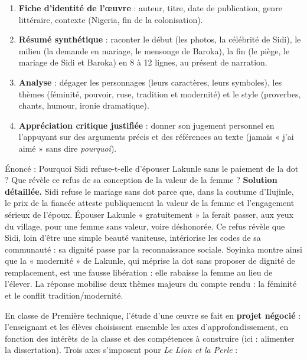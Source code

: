 \documentclass[11pt]{article}
\newcounter{popsec}
\newcounter{popsub}
\newcommand{\courssub}[1]{%
  \stepcounter{popsub}%
  \par\vspace{9pt}\noindent{\popxbold\fontsize{11.5}{13}\selectfont\color{popink}{\color{poporange}\thepopsec.\thepopsub}\hspace{6pt}#1}\par\nopagebreak\vspace{4pt}
}
\begin{document}
\begin{methode}
\begin{enumerate}
\item \textbf{Fiche d'identité de l'œuvre} : auteur, titre, date de publication, genre littéraire, contexte (Nigeria, fin de la colonisation).
\item \textbf{Résumé synthétique} : raconter le début (les photos, la célébrité de Sidi), le milieu (la demande en mariage, le mensonge de Baroka), la fin (le piège, le mariage de Sidi et Baroka) en 8 à 12 lignes, au présent de narration.
\item \textbf{Analyse} : dégager les personnages (leurs caractères, leurs symboles), les thèmes (féminité, pouvoir, ruse, tradition et modernité) et le style (proverbes, chants, humour, ironie dramatique).
\item \textbf{Appréciation critique justifiée} : donner son jugement personnel en l'appuyant sur des arguments précis et des références au texte (jamais « j'ai aimé » sans dire \emph{pourquoi}).
\end{enumerate}
\end{methode}

\begin{exoresolu}
Énoncé : Pourquoi Sidi refuse-t-elle d'épouser Lakunle sans le paiement de la dot ? Que révèle ce refus de sa conception de la valeur de la femme ?
\tcblower
\textbf{Solution détaillée.} Sidi refuse le mariage sans dot parce que, dans la coutume d'Ilujinle, le prix de la fiancée atteste publiquement la valeur de la femme et l'engagement sérieux de l'époux. Épouser Lakunle « gratuitement » la ferait passer, aux yeux du village, pour une femme sans valeur, voire déshonorée. Ce refus révèle que Sidi, loin d'être une simple beauté vaniteuse, intériorise les codes de sa communauté : sa dignité passe par la reconnaissance sociale. Soyinka montre ainsi que la « modernité » de Lakunle, qui méprise la dot sans proposer de dignité de remplacement, est une fausse libération : elle rabaisse la femme au lieu de l'élever. La réponse mobilise deux thèmes majeurs du compte rendu : la féminité et le conflit tradition/modernité.
\end{exoresolu}

\courssub{Négocier le projet d'étude de l'œuvre}

En classe de Première technique, l'étude d'une œuvre se fait en \textbf{projet négocié} : l'enseignant et les élèves choisissent ensemble les axes d'approfondissement, en fonction des intérêts de la classe et des compétences à construire (ici : alimenter la dissertation). Trois axes s'imposent pour \emph{Le Lion et la Perle} :
\end{document}

